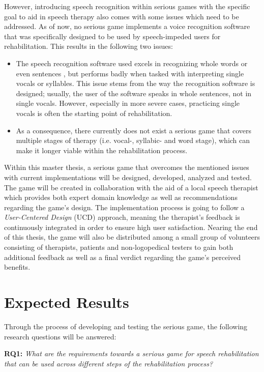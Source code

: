 \documentclass[draft,final]{vutinfth} %
\begin{document}
However, introducing speech recognition within serious games with the specific goal to aid in speech therapy also comes with some issues which need to be addressed. As of now, no serious game implements a voice recognition software that was specifically designed to be used by speech-impeded users for rehabilitation. This results in the following two issues:
\begin{itemize}
\item The speech recognition software used excels in recognizing whole words or even sentences \cite{rohlfing2021hey}, but performs badly when tasked with interpreting single vocals or syllables. This issue stems from the way the recognition software is designed; usually, the user of the software speaks in whole sentences, not in single vocals. However, especially in more severe cases, practicing single vocals is often the starting point of rehabilitation.
\item As a consequence, there currently does not exist a serious game that covers multiple stages of therapy (i.e. vocal-, syllabic- and word stage), which can make it longer viable within the rehabilitation process.
\end{itemize}

Within this master thesis, a serious game that overcomes the mentioned issues with current implementations will be designed, developed, analyzed and tested. The game will be created in collaboration with the aid of a local speech therapist which provides both expert domain knowledge as well as recommendations regarding the game's design. The implementation process is going to follow a \emph{User-Centered Design} (UCD) approach, meaning the therapist's feedback is continuously integrated in order to ensure high user satisfaction. Nearing the end of this thesis, the game will also be distributed among a small group of volunteers consisting of therapists, patients and non-logopedical testers to gain both additional feedback as well as a final verdict regarding the game's perceived benefits. 
\section{Expected Results}
Through the process of developing and testing the serious game, the following research questions will be answered:

\begin{center}
\textbf{RQ1:} \textit{What are the requirements towards a serious game for speech rehabilitation that can be used across different steps of the rehabilitation process?}
\end{center} 
\end{document}
